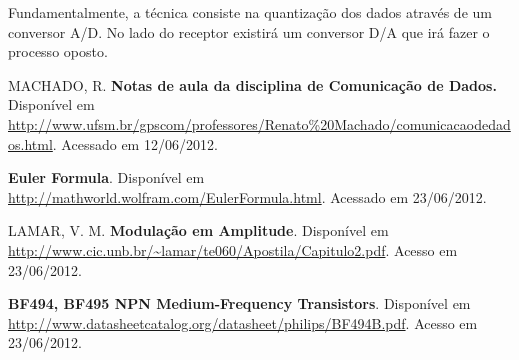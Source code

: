 \documentclass[]{report}
\begin{document}
Fundamentalmente, a técnica consiste na quantização dos dados através de um conversor A/D. No lado do receptor existirá um conversor D/A que irá fazer o processo oposto.


\begin{thebibliography}{100}
 MACHADO, R. 
 \textbf{Notas de aula da disciplina de Comunicação de Dados.}
 Disponível em \url{http://www.ufsm.br/gpscom/professores/Renato\%20Machado/comunicacaodedados.html}. Acessado em 12/06/2012.
 
 \textbf{Euler Formula}. Disponível em \url{http://mathworld.wolfram.com/EulerFormula.html}. Acessado em 23/06/2012.

LAMAR, V. M. \textbf{Modulação em Amplitude}. Disponível em \url{http://www.cic.unb.br/~lamar/te060/Apostila/Capitulo2.pdf}. Acesso em 23/06/2012.

 
\textbf{BF494, BF495 NPN Medium-Frequency Transistors}. Disponível em \url{http://www.datasheetcatalog.org/datasheet/philips/BF494B.pdf}. Acesso em 23/06/2012.


\end{thebibliography}
\end{document}
